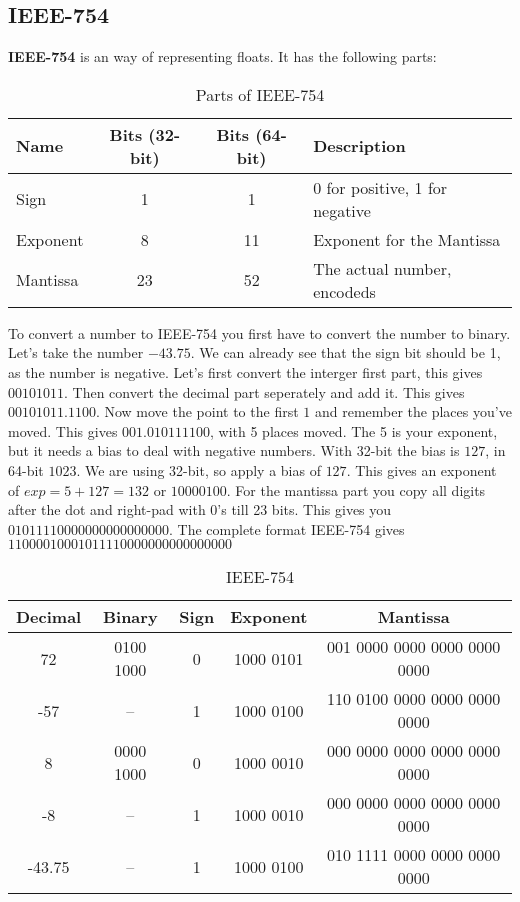 \subsection{IEEE-754}
{\bf IEEE-754} is an way of representing floats.
It has the following parts:

\begin{table}[h]
	\centering
	\begin{tabular}{l | c | c| l}
		Name     & Bits (32-bit) & Bits (64-bit) & Description                    \\
		\hline
		Sign     & 1             & 1             & 0 for positive, 1 for negative \\
		Exponent & 8             & 11            & Exponent for the Mantissa      \\
		Mantissa & 23            & 52            & The actual number, encodeds    \\
	\end{tabular}
	\caption{Parts of IEEE-754}
\end{table}

To convert a number to IEEE-754 you first have to convert the number to binary.
Let's take the number \(-43.75\).
We can already see that the sign bit should be 1, as the number is negative.
Let's first convert the interger first part, this gives \(0010 1011\).
Then convert the decimal part seperately and add it.
This gives \(0010 1011 . 1100\).
Now move the point to the first \(1\) and remember the places you've moved.
This gives \(001.0 1011 1100\), with 5 places moved.
The 5 is your exponent, but it needs a bias to deal with negative numbers.
With 32-bit the bias is \(127\), in 64-bit \(1023\).
We are using 32-bit, so apply a bias of \(127\).
This gives an exponent of \(exp = 5 + 127 = 132\) or \(1000 0100\).
For the mantissa part you copy all digits after the dot and right-pad with 0's till 23 bits.
This gives you \(010 1111 0000 0000 0000 0000\).
The complete format IEEE-754 gives \(1100 0010 0010 1111 0000 0000 0000 0000\)

\begin{table}[h]
	\centering
	\begin{tabular}{c | c | c | c | c}
		Decimal & Binary    & Sign & Exponent  & Mantissa                     \\
		\hline
		72      & 0100 1000 & 0    & 1000 0101 & 001 0000 0000 0000 0000 0000 \\
		-57     & --        & 1    & 1000 0100 & 110 0100 0000 0000 0000 0000 \\
		8       & 0000 1000 & 0    & 1000 0010 & 000 0000 0000 0000 0000 0000 \\
		-8      & --        & 1    & 1000 0010 & 000 0000 0000 0000 0000 0000 \\
		-43.75  & --        & 1    & 1000 0100 & 010 1111 0000 0000 0000 0000 \\
	\end{tabular}
	\caption{IEEE-754}
\end{table}
